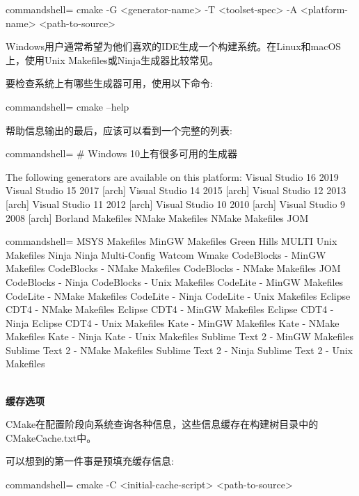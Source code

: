 \begin{tcblisting}{commandshell={}}
cmake -G <generator-name>
      -T <toolset-spec> -A <platform-name>
      <path-to-source>
\end{tcblisting}

Windows用户通常希望为他们喜欢的IDE生成一个构建系统。在Linux和macOS上，使用Unix Makefiles或Ninja生成器比较常见。

要检查系统上有哪些生成器可用，使用以下命令:

\begin{tcblisting}{commandshell={}}
cmake --help
\end{tcblisting}

帮助信息输出的最后，应该可以看到一个完整的列表:

\begin{tcblisting}{commandshell={}}
# Windows 10上有很多可用的生成器

The following generators are available on this platform:
Visual Studio 16 2019
Visual Studio 15 2017 [arch]
Visual Studio 14 2015 [arch]
Visual Studio 12 2013 [arch]
Visual Studio 11 2012 [arch]
Visual Studio 10 2010 [arch]
Visual Studio 9 2008 [arch]
Borland Makefiles
NMake Makefiles
NMake Makefiles JOM
\end{tcblisting}
\begin{tcblisting}{commandshell={}}
MSYS Makefiles
MinGW Makefiles
Green Hills MULTI
Unix Makefiles
Ninja
Ninja Multi-Config
Watcom Wmake
CodeBlocks - MinGW Makefiles
CodeBlocks - NMake Makefiles
CodeBlocks - NMake Makefiles JOM
CodeBlocks - Ninja
CodeBlocks - Unix Makefiles
CodeLite - MinGW Makefiles
CodeLite - NMake Makefiles
CodeLite - Ninja
CodeLite - Unix Makefiles
Eclipse CDT4 - NMake Makefiles
Eclipse CDT4 - MinGW Makefiles
Eclipse CDT4 - Ninja
Eclipse CDT4 - Unix Makefiles
Kate - MinGW Makefiles
Kate - NMake Makefiles
Kate - Ninja
Kate - Unix Makefiles
Sublime Text 2 - MinGW Makefiles
Sublime Text 2 - NMake Makefiles
Sublime Text 2 - Ninja
Sublime Text 2 - Unix Makefiles
\end{tcblisting}

\hspace*{\fill} \\ %
\noindent
\textbf{缓存选项}

CMake在配置阶段向系统查询各种信息，这些信息缓存在构建树目录中的CMakeCache.txt中。

可以想到的第一件事是预填充缓存信息:

\begin{tcblisting}{commandshell={}}
cmake -C <initial-cache-script> <path-to-source>
\end{tcblisting}

